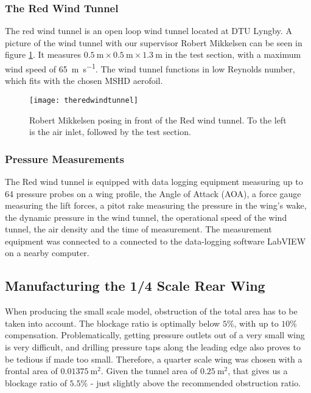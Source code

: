     \subsubsection{The Red Wind Tunnel}

      The red wind tunnel is an open loop wind tunnel located at DTU Lyngby. A picture of the wind tunnel with our supervisor Robert Mikkelsen can be seen in figure \ref{fig:theredwindtunnel}. It measures $\SI{0.5}{\metre} \times \SI{0.5}{\metre} \times \SI{1.3}{\metre}$ in the test section, with a maximum wind speed of \SI{65}{\metre\per\second}. The wind tunnel functions in low Reynolds number, which fits with the chosen MSHD aerofoil.

      \begin{figure}
        \texttt{[image: theredwindtunnel]}
        \caption{Robert Mikkelsen posing in front of the Red wind tunnel. To the left is the air inlet, followed by the test section.}
        \label{fig:theredwindtunnel}
      \end{figure}

    \subsubsection{Pressure Measurements}

      The Red wind tunnel is equipped with data logging equipment measuring up to 64 pressure probes on a wing profile, the Angle of Attack (AOA), a force gauge measuring the lift forces, a pitot rake measuring the pressure in the wing's wake, the dynamic pressure in the wind tunnel, the operational speed of the wind tunnel, the air density and the time of measurement. The measurement equipment was connected to a  connected to the data-logging software LabVIEW on a nearby computer.

  \subsection{Manufacturing the 1/4 Scale Rear Wing}

    When producing the small scale model, obstruction of the total area has to be taken into account. The blockage ratio is optimally below $5\%$, with up to $10\%$ compensation. Problematically, getting pressure outlets out of a very small wing is very difficult, and drilling pressure taps along the leading edge also proves to be tedious if made too small. Therefore, a quarter scale wing was chosen with a frontal area of $\SI{0.01375}{\metre\squared}$. Given the tunnel area of $\SI{0.25}{\metre\squared}$, that gives us a blockage ratio of $5.5\%$ - just slightly above the recommended obstruction ratio.

